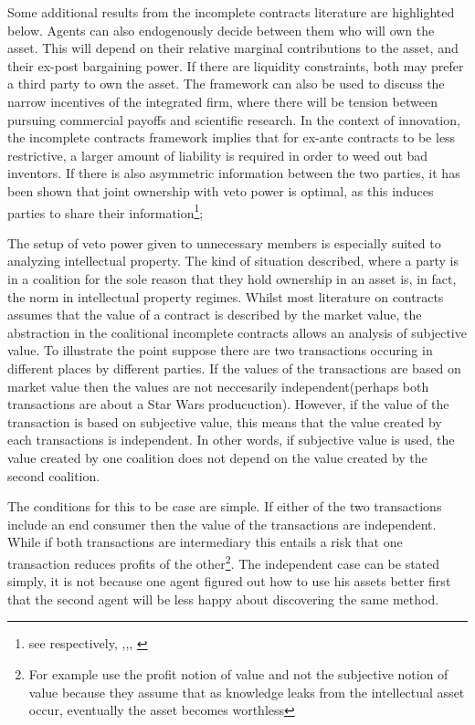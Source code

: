 Some additional results from the incomplete contracts literature are highlighted below. Agents can also endogenously decide between them who will own the asset. This will depend on their relative marginal contributions to the asset, and their ex-post bargaining power. If there are liquidity constraints, both may prefer a third party to own the asset. The framework can also be used to discuss the narrow incentives of the integrated firm, where there will be tension between pursuing commercial payoffs and scientific research. In the context of innovation, the incomplete contracts framework implies that for ex-ante contracts to be less restrictive, a larger amount of liability is required in order to weed out bad inventors. If there is also asymmetric information between the two parties, it has been shown that joint ownership with veto power is optimal, as this induces parties to share their information\footnote{see respectively, \cite{Aghion1994},\citep{lerner2010contractibility},\citep{anton1994expropriation}, \citep{Rosenkranz1999}};

The setup of veto power given to unnecessary members is especially suited to analyzing intellectual property. The kind of situation described, where a party is in a coalition for the sole reason that they hold ownership in an asset is, in fact, the norm in intellectual property regimes. Whilst most literature on contracts assumes that the value of a contract is described by the market value, the abstraction in the coalitional incomplete contracts allows an analysis of subjective value. To illustrate the point suppose there are two transactions occuring in different places by different parties. If the values of the transactions are based on market value then the values are not neccesarily independent(perhaps both transactions are about a Star Wars producuction). However, if the value of the transaction is based on subjective value, this means that the value created by each transactions is independent. In other words, if subjective value is used, the value created by one coalition does not depend on the value created by the second coalition. 

The conditions for this to be case are simple. If either of the two transactions include an end consumer then the value of the transactions are independent. While if both transactions are intermediary this entails a risk that one transaction reduces profits of the other\footnote{ For example \cite{anton1994expropriation} use the profit notion of value and not the subjective notion of value because they assume that as knowledge leaks from the intellectual asset occur, eventually the asset becomes worthless}. The independent case can be stated simply, it is not because one agent figured out how to use his assets better first that the second agent will be less happy about discovering the same method. 


